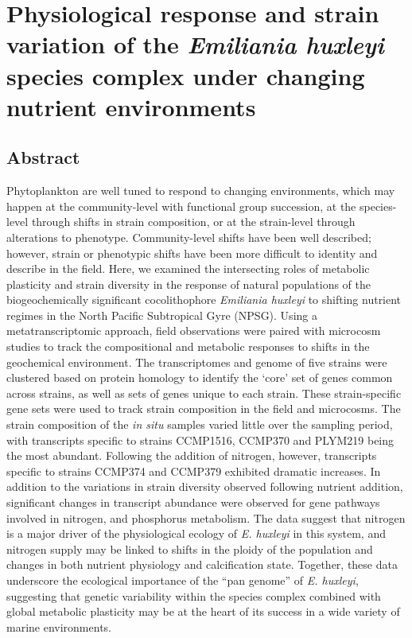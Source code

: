 

\chapter{Physiological response and strain variation of the \textsl{Emiliania huxleyi} species complex under changing nutrient environments}
\label{chap:5}
\raggedbottom


\clearpage

\section{Abstract} 
Phytoplankton are well tuned to respond to changing environments, which may happen at the community-level with functional group succession, at the species-level through shifts in strain composition, or at the strain-level through alterations to phenotype. Community-level shifts have been well described; however, strain or phenotypic shifts have been more difficult to identity and describe in the field. Here, we examined the intersecting roles of metabolic plasticity and strain diversity in the response of natural populations of the biogeochemically significant cocolithophore \textit{Emiliania huxleyi} to shifting nutrient regimes in the North Pacific Subtropical Gyre (NPSG). Using a metatranscriptomic approach, field observations were paired with microcosm studies to track the compositional and metabolic responses to shifts in the geochemical environment. The transcriptomes and genome of five strains were clustered based on protein homology to identify the `core' set of genes common across strains, as well as sets of genes unique to each strain. These strain-specific gene sets were used to track strain composition in the field and microcosms. The strain composition of the \textit{in situ} samples varied little over the sampling period, with transcripts specific to strains CCMP1516, CCMP370 and PLYM219 being the most abundant.  Following the addition of nitrogen, however, transcripts specific to strains CCMP374 and CCMP379 exhibited dramatic increases. In addition to the variations in strain diversity observed following nutrient addition, significant changes in transcript abundance were observed for gene pathways involved in nitrogen, and phosphorus metabolism.  The data suggest that nitrogen is a major driver of the physiological ecology of \textit{E. huxleyi} in this system, and nitrogen supply may be linked to shifts in the ploidy of the population and changes in both nutrient physiology and calcification state. Together, these data underscore the ecological importance of the ``pan genome'' of \textit{E. huxleyi}, suggesting that genetic variability within the species complex combined with global metabolic plasticity may be at the heart of its success in a wide variety of marine environments. \par

